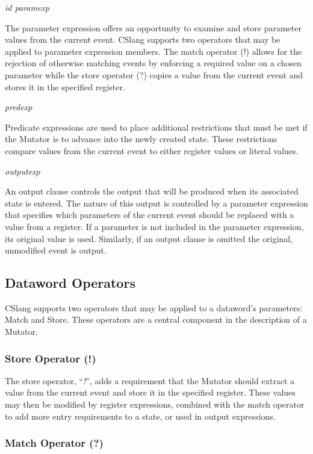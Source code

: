 \textit{id paramexp}

The parameter expression offers an opportunity to examine and store
parameter values from the current event.  CSlang supports two operators
that may be applied to parameter expression members.  The match operator
(!) allows for the rejection of otherwise matching events
by enforcing a required value on a
chosen parameter while the store operator (?) copies a value from the
current event and stores it in the specified register.


\textit{predexp}

Predicate expressions are used to place additional restrictions that must
be met if the Mutator is to advance into the newly created state.  These
restrictions compare values from the current event to either register
values or literal values.

\textit{outputexp}

An output clause controls the output that will be produced when its
associated state is entered.  The nature of this output is controlled by a
parameter expression that specifies which parameters of the current event
should be replaced with a value from a register.  If a parameter is not
included in the parameter expression, its original value is used.
Similarly,
if an output clause is omitted the original, unmodified event is output.

\subsection{Dataword Operators}
\label{sub:DatawordOperators}

CSlang supports two operators that may be applied to a dataword's
parameters: Match and Store.  These operators are a central component in
the description of a Mutator.

\subsubsection{Store Operator (!)}

The store operator, ``\textit{!}'', adds a requirement that the
Mutator should extract a value from the current event and store
it in the specified register.  These values may then be modified by
register expressions, combined with the match operator to add more
entry requirements to a state, or used in output expressions.

\subsubsection{Match Operator (?)}

